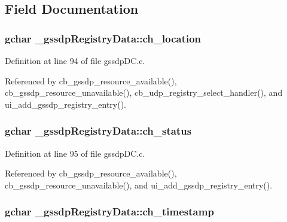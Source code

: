 \subsection{Field Documentation}
\hypertarget{struct__gssdp_registry_data_ac1ca256d22c387e9ef968fb8413d7796}{
\subsubsection[{ch\+\_\+location}]{\setlength{\rightskip}{0pt plus 5cm}gchar \+\_\+gssdp\+Registry\+Data\+::ch\+\_\+location}}\label{struct__gssdp_registry_data_ac1ca256d22c387e9ef968fb8413d7796}


Definition at line 94 of file gssdp\+D\+C.\+c.



Referenced by cb\+\_\+gssdp\+\_\+resource\+\_\+available(), cb\+\_\+gssdp\+\_\+resource\+\_\+unavailable(), cb\+\_\+udp\+\_\+registry\+\_\+select\+\_\+handler(), and ui\+\_\+add\+\_\+gssdp\+\_\+registry\+\_\+entry().

\hypertarget{struct__gssdp_registry_data_a92d851353d8779ad1c5dd4e540a956e5}{
\subsubsection[{ch\+\_\+status}]{\setlength{\rightskip}{0pt plus 5cm}gchar \+\_\+gssdp\+Registry\+Data\+::ch\+\_\+status}}\label{struct__gssdp_registry_data_a92d851353d8779ad1c5dd4e540a956e5}


Definition at line 95 of file gssdp\+D\+C.\+c.



Referenced by cb\+\_\+gssdp\+\_\+resource\+\_\+available(), cb\+\_\+gssdp\+\_\+resource\+\_\+unavailable(), and ui\+\_\+add\+\_\+gssdp\+\_\+registry\+\_\+entry().

\hypertarget{struct__gssdp_registry_data_a97c1fccf55465d4de2168be0d70e2707}{
\subsubsection[{ch\+\_\+timestamp}]{\setlength{\rightskip}{0pt plus 5cm}gchar \+\_\+gssdp\+Registry\+Data\+::ch\+\_\+timestamp}}\label{struct__gssdp_registry_data_a97c1fccf55465d4de2168be0d70e2707}


